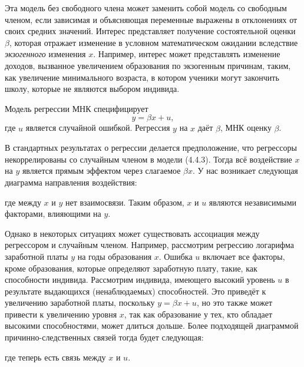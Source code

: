 Эта модель без свободного члена может заменить собой модель со свободным членом, если зависимая и объясняющая переменные выражены в отклонениях от своих средних значений. Интерес представляет получение состоятельной оценки $\beta$, которая отражает изменение в условном математическом ожидании вследствие \textit{экзогенного} изменения $x$. Например, интерес может представлять изменение доходов, вызванное увеличением образования по экзогенным причинам, таким, как увеличение минимального возраста, в котором ученики могут закончить школу, которые не являются выбором индивида.

Модель регрессии МНК специфицирует 
\begin{equation}
y = \beta x +u,
\end{equation}
где $u$ является случайной ошибкой. Регрессия $y$ на $x$ даёт $\hat{\beta}$, МНК оценку $\beta$. 

В стандартных результатах о регрессии делается предположение, что регрессоры некоррелированы со случайным членом в модели (4.4.3). Тогда всё воздействие $x$ на $y$ является прямым эффектом через слагаемое  $\beta x$. У нас возникает следующая диаграмма направления воздействия:

\vspace{4cm}
\begin{figure}
\end{figure}

где между $x$ и $y$ нет взаимосвязи. Таким образом, $x$ и $u$ являются независимыми факторами, влияющими на $y$.

Однако в некоторых ситуациях может существовать ассоциация между регрессором и случайным членом. Например,  рассмотрим регрессию логарифма заработной платы $y$ на годы образования $x$. Ошибка $u$ включает все факторы, кроме образования, которые определяют заработную плату, такие, как способности индивида. Рассмотрим индивида, имеющего высокий уровень $u$ в результате выдающихся (ненаблюдаемых) способностей. Это приведёт к увеличению заработной платы, поскольку $y = \beta x +u$, но это также может привести к увеличению уровня $x$, так как образование у тех, кто обладает высокими способностями, может длиться дольше. Более подходящей диаграммой причинно-следственных связей  тогда будет следующая:

\vspace{4cm}
\begin{figure}
\end{figure} 
где теперь есть связь между $x$ и $u$.

